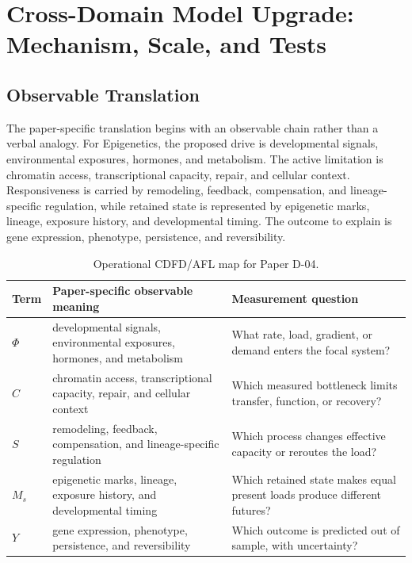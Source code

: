 \documentclass[11pt,a4paper]{article}
\begin{document}
\section{Cross-Domain Model Upgrade: Mechanism, Scale, and Tests}

\subsection{Observable Translation}

The paper-specific translation begins with an observable chain rather than a
verbal analogy. For Epigenetics, the proposed drive is developmental signals, environmental exposures, hormones, and metabolism.
The active limitation is chromatin access, transcriptional capacity, repair, and cellular context. Responsiveness is carried by
remodeling, feedback, compensation, and lineage-specific regulation, while retained state is represented by
epigenetic marks, lineage, exposure history, and developmental timing. The outcome to explain is gene expression, phenotype, persistence, and reversibility.

\begin{table}[htbp]
\centering
\small
\caption{Operational CDFD/AFL map for Paper D-04.}
\begin{tabularx}{\textwidth}{|l|X|X|}
\hline
\textbf{Term} & \textbf{Paper-specific observable meaning} & \textbf{Measurement question} \\
\hline
$\Phi$ & developmental signals, environmental exposures, hormones, and metabolism & What rate, load, gradient, or demand enters the focal system? \\
\hline
$C$ & chromatin access, transcriptional capacity, repair, and cellular context & Which measured bottleneck limits transfer, function, or recovery? \\
\hline
$S$ & remodeling, feedback, compensation, and lineage-specific regulation & Which process changes effective capacity or reroutes the load? \\
\hline
$M_s$ & epigenetic marks, lineage, exposure history, and developmental timing & Which retained state makes equal present loads produce different futures? \\
\hline
$Y$ & gene expression, phenotype, persistence, and reversibility & Which outcome is predicted out of sample, with uncertainty? \\
\hline
\end{tabularx}
\end{table}
\end{document}
